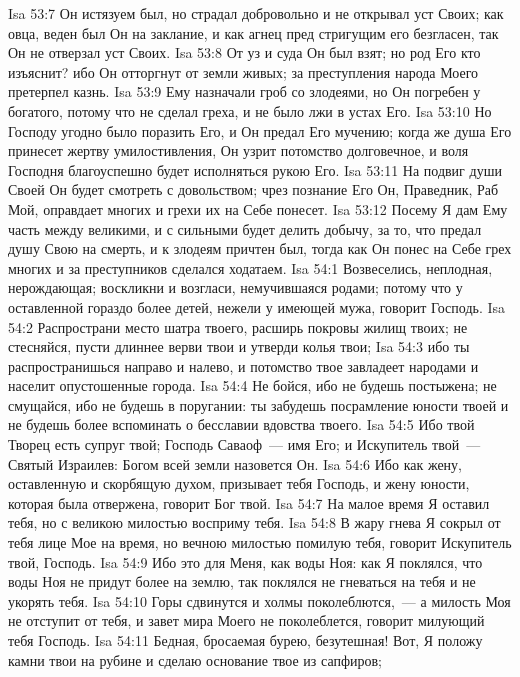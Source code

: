 \vs Isa 53:7 Он истязуем был, но страдал добровольно и не открывал уст Своих; как овца, веден был Он на заклание, и как агнец пред стригущим его безгласен, так Он не отверзал уст Своих.
\vs Isa 53:8 От уз и суда Он был взят; но род Его кто изъяснит? ибо Он отторгнут от земли живых; за преступления народа Моего претерпел казнь.
\vs Isa 53:9 Ему назначали гроб со злодеями, но Он погребен у богатого, потому что не сделал греха, и не было лжи в устах Его.
\vs Isa 53:10 Но Господу угодно было поразить Его, и Он предал Его мучению; когда же душа Его принесет жертву умилостивления, Он узрит потомство долговечное, и воля Господня благоуспешно будет исполняться рукою Его.
\vs Isa 53:11 На подвиг души Своей Он будет смотреть с довольством; чрез познание Его Он, Праведник, Раб Мой, оправдает многих и грехи их на Себе понесет.
\vs Isa 53:12 Посему Я дам Ему часть между великими, и с сильными будет делить добычу, за то, что предал душу Свою на смерть, и к злодеям причтен был, тогда как Он понес на Себе грех многих и за преступников сделался ходатаем.
\vs Isa 54:1 Возвеселись, неплодная, нерождающая; воскликни и возгласи, немучившаяся родами; потому что у оставленной гораздо более детей, нежели у имеющей мужа, говорит Господь.
\vs Isa 54:2 Распространи место шатра твоего, расширь покровы жилищ твоих; не стесняйся, пусти длиннее верви твои и утверди колья твои;
\vs Isa 54:3 ибо ты распространишься направо и налево, и потомство твое завладеет народами и населит опустошенные города.
\vs Isa 54:4 Не бойся, ибо не будешь постыжена; не смущайся, ибо не будешь в поругании: ты забудешь посрамление юности твоей и не будешь более вспоминать о бесславии вдовства твоего.
\vs Isa 54:5 Ибо твой Творец есть супруг твой; Господь Саваоф~--- имя Его; и Искупитель твой~--- Святый Израилев: Богом всей земли назовется Он.
\vs Isa 54:6 Ибо как жену, оставленную и скорбящую духом, призывает тебя Господь, и  жену юности, которая была отвержена, говорит Бог твой.
\vs Isa 54:7 На малое время Я оставил тебя, но с великою милостью восприму тебя.
\vs Isa 54:8 В жару гнева Я сокрыл от тебя лице Мое на время, но вечною милостью помилую тебя, говорит Искупитель твой, Господь.
\vs Isa 54:9 Ибо это для Меня, как воды Ноя: как Я поклялся, что воды Ноя не придут более на землю, так поклялся не гневаться на тебя и не укорять тебя.
\vs Isa 54:10 Горы сдвинутся и холмы поколеблются,~--- а милость Моя не отступит от тебя, и завет мира Моего не поколеблется, говорит милующий тебя Господь.
\vs Isa 54:11 Бедная, бросаемая бурею, безутешная! Вот, Я положу камни твои на рубине и сделаю основание твое из сапфиров;

